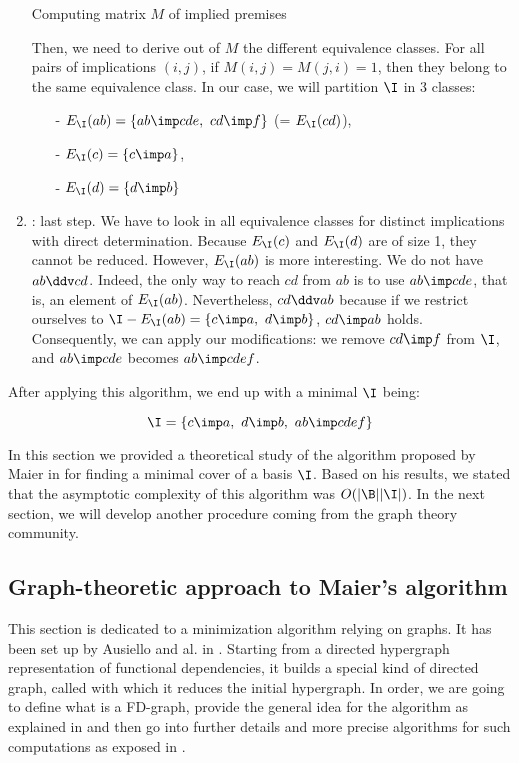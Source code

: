 \begin{enumerate}
\begin{table}[ht]
{		}
		\caption{Computing matrix $M$ of implied premises}
		\label{tab:Maier-Mat}
	\end{table}
	
	\noindent Then, we need to derive out of $M$ the different equivalence 
	classes. For all pairs of implications $(i, j)$, if $M(i, j) = M(j, i) = 1$,
	then they belong to the same equivalence class. In our case, we will 
	partition $\I$ in 3 classes:
	\begin{itemize}
		\item[-] $E_{\I}(ab) = \{ ab \imp cde, \ cd \imp f \}$ (= $E_{\I}(cd)$),
		\item[-] $E_{\I}(c) = \{ c \imp a \}$,
		\item[-] $E_{\I}(d) = \{ d \imp b \}$
	\end{itemize}
	\item {}: last step. We have to look in
	all equivalence classes for distinct implications with direct determination.
	Because $E_{\I}(c)$ and $E_{\I}(d)$ are of size 1, they cannot be reduced.
	However, $E_{\I}(ab)$ is more interesting. We do not have $ab \ddv cd$. 
	Indeed, the only way to reach $cd$ from $ab$ is to use $ab \imp cde$, that 
	is, an element of $E_{\I}(ab)$. Nevertheless, $cd \ddv ab$ because if we 
	restrict ourselves to $\I - E_{\I}(ab) = \{ c \imp a, \ d \imp b \}$, $cd 
	\imp ab$ holds. Consequently, we can apply our modifications: we remove 
	$cd \imp f$ from $\I$, and $ab \imp cde$ becomes $ab \imp cdef$.
\end{enumerate}
After applying this algorithm, we end up with a minimal $\I$ being:

\[ \I = \{ c \imp a, \ d \imp b, \ ab \imp cdef \} \]

\vspace{1.2em}

In this section we provided a theoretical study of the algorithm 
proposed by Maier in \cite{maier_theory_1983, david_minimum_1980} for finding a 
minimal cover of a basis $\I$. Based on his results, we stated that the  
asymptotic complexity of this algorithm was $O(|\B||\I|)$. In the next section, 
we will develop another procedure coming from the graph theory community.

\subsection{Graph-theoretic approach to Maier's algorithm}

This section is dedicated to a minimization algorithm relying on graphs. 
It has been set up by Ausiello and al. in \cite{ausiello_directed_2017, 
ausiello_graph_1983, ausiello_minimal_1986}. Starting from a directed 
hypergraph representation of functional dependencies, it builds a special kind 
of directed graph, called  with which it reduces the initial 
hypergraph. In order, we are going to define what is a FD-graph, provide the 
general idea for the algorithm as explained in \cite{ausiello_minimal_1986} and 
then go into further details and more precise algorithms for such computations 
as exposed in \cite{ausiello_graph_1983}.

